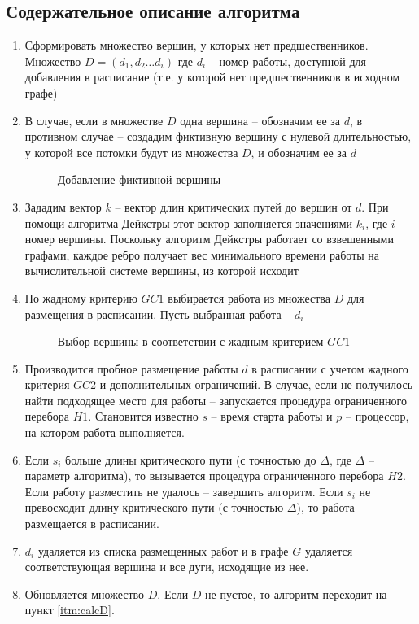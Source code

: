 \subsection{Содержательное описание алгоритма}
\begin{enumerate}
    \item Сформировать множество вершин, у которых нет предшественников. Множество $D = \left( d_1, d_2 \dots d_i \right)$ где $d_i$ – номер работы, доступной для добавления в расписание (т.е. у которой нет предшественников в исходном графе)
    \item В случае, если в множестве $D$ одна вершина – обозначим ее за $d$, в противном случае – создадим фиктивную вершину с нулевой длительностью, у которой все потомки будут из множества $D$, и обозначим ее за $d$
    \begin{figure}[H]
        \caption{Добавление фиктивной вершины}
    \end{figure}
    \item Зададим вектор $k$ – вектор длин критических путей до вершин от $d$. При помощи алгоритма Дейкстры этот вектор заполняется значениями $k_i$, где $i$ – номер вершины. Поскольку алгоритм Дейкстры работает со взвешенными графами, каждое ребро получает вес минимального времени работы на вычислительной системе вершины, из которой исходит
    \item \label{itm:calcD} По жадному критерию $GC1$ выбирается работа из множества $D$ для размещения в расписании. Пусть выбранная работа – $d_i$
    \begin{figure}[H]
        \caption{Выбор вершины в соответствии с жадным критерием $GC1$}
    \end{figure}
    \item Производится пробное размещение работы $d$ в расписании с учетом жадного критерия $GC2$ и дополнительных ограничений. В случае, если не получилось найти подходящее место для работы – запускается процедура ограниченного перебора $H1$. Становится известно $s$ – время старта работы и $p$ – процессор, на котором работа выполняется.
    \item Если $s_i$ больше длины критического пути (с точностью до $\Delta$, где $\Delta$ – параметр алгоритма), то вызывается процедура ограниченного перебора $H2$. Если работу разместить не удалось – завершить алгоритм. Если $s_i$ не превосходит длину критического пути (с точностью $\Delta$), то работа размещается в расписании.
    \item $d_i$ удаляется из списка размещенных работ и в графе $G$ удаляется соответствующая вершина и все дуги, исходящие из нее.
    \item Обновляется множество $D$. Если $D$ не пустое, то алгоритм переходит на пункт \ref{itm:calcD}.
\end{enumerate}

